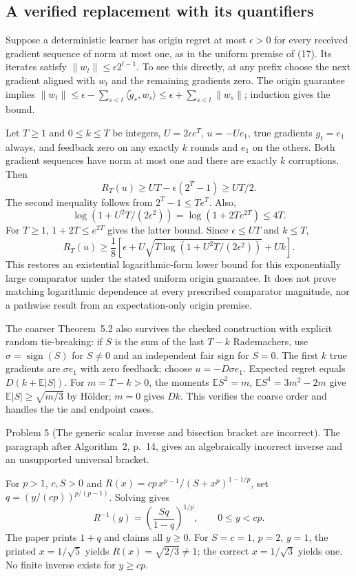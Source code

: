 \documentclass[10pt]{article}
\begin{document}
\subsection*{A verified replacement with its quantifiers}
Suppose a deterministic learner has origin regret at most \(\epsilon>0\) for every received gradient sequence of norm at most one, as in the uniform premise of (17). Its iterates satisfy \(\|w_t\|\le\epsilon2^{t-1}\). To see this directly, at any prefix choose the next gradient aligned with \(w_t\) and the remaining gradients zero. The origin guarantee implies \(\|w_t\|\le\epsilon-\sum_{s<t}\langle\widetilde g_s,w_s\rangle
 \le\epsilon+\sum_{s<t}\|w_s\|\); induction gives the bound.\par
Let \(T\ge1\) and \(0\le k\le T\) be integers, \(U=2\epsilon e^T\), \(u=-Ue_1\), true gradients \(g_t=e_1\) always, and feedback zero on any exactly \(k\) rounds and \(e_1\) on the others. Both gradient sequences have norm at most one and there are exactly \(k\) corruptions. Then \[R_T(u)\ge UT-\epsilon(2^T-1)\ge UT/2.\] The second inequality follows from \(2^T-1\le Te^T\). Also, \[\log(1+U^2T/(2\epsilon^2))=\log(1+2Te^{2T})\le4T.\] For \(T\ge1\), \(1+2T\le e^{2T}\) gives the latter bound. Since \(\epsilon\le UT\) and \(k\le T\), \[R_T(u)\ge\frac18\left[
 \epsilon+U\sqrt{T\log(1+U^2T/(2\epsilon^2))}+Uk\right].\] This restores an existential logarithmic-form lower bound for this exponentially large comparator under the stated uniform origin guarantee. It does not prove matching logarithmic dependence at every prescribed comparator magnitude, nor a pathwise result from an expectation-only origin premise.\par
The coarser Theorem 5.2 also survives the checked construction with explicit random tie-breaking: if \(S\) is the sum of the last \(T-k\) Rademachers, use \(\sigma=\operatorname{sign}(S)\) for \(S\ne0\) and an independent fair sign for \(S=0\). The first \(k\) true gradients are \(\sigma e_1\) with zero feedback; choose \(u=-D\sigma e_1\). Expected regret equals \(D(k+\mathbb E|S|)\). For \(m=T-k>0\), the moments \(\mathbb ES^2=m\), \(\mathbb ES^4=3m^2-2m\) give \(\mathbb E|S|\ge\sqrt{m/3}\) by Hölder; \(m=0\) gives \(Dk\). This verifies the coarse order and handles the tie and endpoint cases.\par
Problem 5 (The generic scalar inverse and bisection bracket are incorrect).  The paragraph after Algorithm 2, p. 14, gives an algebraically incorrect inverse and an unsupported universal bracket.\par
For \(p>1\), \(c,S>0\) and \(R(x)=cp\,x^{p-1}/(S+x^p)^{1-1/p}\), set \(q=(y/(cp))^{p/(p-1)}\). Solving gives \[R^{-1}(y)=\left(\frac{Sq}{1-q}\right)^{1/p},
 \qquad 0\le y<cp .\] The paper prints \(1+q\) and claims all \(y\ge0\). For \(S=c=1\), \(p=2\), \(y=1\), the printed \(x=1/\sqrt5\) yields \(R(x)=\sqrt{2/3}\ne1\); the correct \(x=1/\sqrt3\) yields one. No finite inverse exists for \(y\ge cp\).\par
\end{document}
